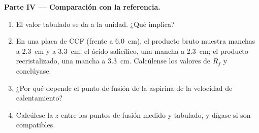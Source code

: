 \begin{problem}
\noindent\textbf{Parte IV --- Comparación con la referencia.}
\begin{enumerate}[resume]
  \item El valor tabulado se da a la unidad. ¿Qué 
        implica?
  \item En una placa de CCF (frente a \qty{6.0}{cm}), el producto bruto
        muestra manchas a \qty{2.3}{cm} y a \qty{3.3}{cm}; el ácido
        salicílico, una mancha a \qty{2.3}{cm}; el producto recristalizado,
        una mancha a \qty{3.3}{cm}. Calcúlense los valores de $R_f$ y
        conclúyase.
  \item ¿Por qué depende el punto de fusión de la aspirina de la
        velocidad de calentamiento?
  \item Calcúlese la  $z$ entre los puntos de fusión
        medido y tabulado, y dígase si son compatibles.
\end{enumerate}
\end{problem}
